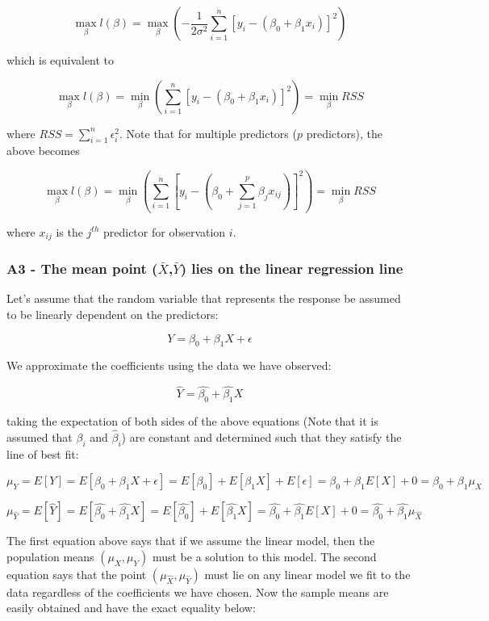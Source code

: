 \documentclass[11pt]{article}
\begin{document}
\[\max_{\beta} l(\beta) = \max_{\beta} \left( - \frac{1}{2\sigma^2} \sum_{i=1}^n [y_i - (\beta_0 + \beta_1 x_i) ]^2 \right)\]

which is equivalent to

\[\max_{\beta} l(\beta) = \min_{\beta} \left( \sum_{i=1}^n [y_i - (\beta_0 + \beta_1 x_i) ]^2 \right) = \min_{\beta} RSS\]

where \(RSS = \sum_{i=1}^n \epsilon_i^2\). Note that for multiple
predictors (\(p\) predictors), the above becomes

\[\max_{\beta} l(\beta) = \min_{\beta} \left( \sum_{i=1}^n \left[y_i - \left(\beta_0 + \sum_{j=1}^p \beta_j x_{ij} \right) \right]^2 \right) = \min_{\beta} RSS\]

where \(x_{ij}\) is the \(j^{th}\) predictor for observation \(i\).

    \subsubsection{\texorpdfstring{A3 - The mean point
(\(\bar{X}\),\(\bar{Y}\)) lies on the linear regression
line}{A3 - The mean point (\textbackslash{}bar\{X\},\textbackslash{}bar\{Y\}) lies on the linear regression line}}\label{a3---the-mean-point-barxbary-lies-on-the-linear-regression-line}

Let's assume that the random variable that represents the response be
assumed to be linearly dependent on the predictors:

\[Y = \beta_0 + \beta_1 X + \epsilon\]

We approximate the coefficients using the data we have observed:

\[\hat{Y} = \hat{\beta_0} + \hat{\beta_1} X\]

taking the expectation of both sides of the above equations (Note that
it is assumed that \(\beta_i\) and \(\hat{\beta}_i\)) are constant and
determined such that they satisfy the line of best fit:

\[\mu_Y = E[Y] = E[\beta_0 + \beta_1 X + \epsilon] = E[\beta_0] + E[\beta_1 X] + E[\epsilon] = \beta_0 + \beta_1 E[X] + 0 = \beta_0 + \beta_1 \mu_X\]

\[\mu_{\hat{Y}} = E[\hat{Y}] = E[\hat{\beta_0} + \hat{\beta_1} X] = E[\hat{\beta_0}] + E[\hat{\beta_1} X] = \hat{\beta_0} + \hat{\beta_1} E[X] + 0 = \hat{\beta_0} + \hat{\beta_1} \mu_{\hat{X}}\]

The first equation above says that if we assume the linear model, then
the population means \((\mu_X,\mu_Y)\) must be a solution to this model.
The second equation says that the point
\((\mu_{\hat{X}},\mu_{\hat{Y}})\) must lie on any linear model we fit to
the data regardless of the coefficients we have chosen. Now the sample
means are easily obtained and have the exact equality below:
\end{document}
